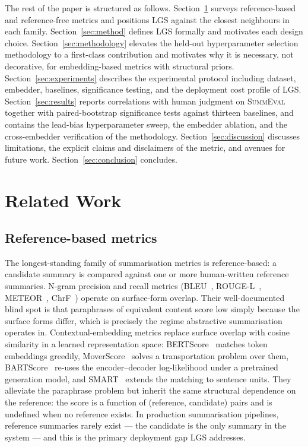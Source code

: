 \documentclass[journal]{IEEEtran}
\begin{document}
The rest of the paper is structured as follows.
Section~\ref{sec:related} surveys reference-based and reference-free
metrics and positions LGS against the closest neighbours in each
family. Section~\ref{sec:method} defines LGS formally and motivates
each design choice. Section~\ref{sec:methodology} elevates the
held-out hyperparameter selection methodology to a first-class
contribution and motivates why it is necessary, not decorative,
for embedding-based metrics with structural priors.
Section~\ref{sec:experiments} describes the experimental protocol
including dataset, embedder, baselines, significance testing, and
the deployment cost profile of LGS.
Section~\ref{sec:results} reports correlations with human judgment
on \textsc{SummEval} together with paired-bootstrap significance
tests against thirteen baselines, and contains the lead-bias
hyperparameter sweep, the embedder ablation, and the cross-embedder
verification of the methodology. Section~\ref{sec:discussion}
discusses limitations, the explicit claims and disclaimers of the
metric, and avenues for future work.
Section~\ref{sec:conclusion} concludes.

\section{Related Work}
\label{sec:related}

\subsection{Reference-based metrics}
The longest-standing family of summarisation metrics is
reference-based: a candidate summary is compared against one or
more human-written reference summaries.
N-gram precision and recall metrics
(BLEU~\cite{papineni2002bleu}, ROUGE-L~\cite{lin2004rouge},
METEOR~\cite{banerjee2005meteor}, ChrF~\cite{popovic2015chrf})
operate on surface-form overlap. Their well-documented blind spot
is that paraphrases of equivalent content score low simply because
the surface forms differ, which is precisely the regime
abstractive summarisation operates in.
Contextual-embedding metrics replace surface overlap with cosine
similarity in a learned representation space:
BERTScore~\cite{zhang2020bertscore} matches token embeddings
greedily, MoverScore~\cite{zhao2019moverscore} solves a
transportation problem over them, BARTScore~\cite{yuan2021bartscore}
re-uses the encoder--decoder log-likelihood under a pretrained
generation model, and SMART~\cite{amplayo2022smart} extends the
matching to sentence units. They alleviate the paraphrase problem
but inherit the same structural dependence on the reference: the
score is a function of (reference, candidate) pairs and is
undefined when no reference exists. In production summarisation
pipelines, reference summaries rarely exist --- the candidate is
the only summary in the system --- and this is the primary
deployment gap LGS addresses.
\end{document}
